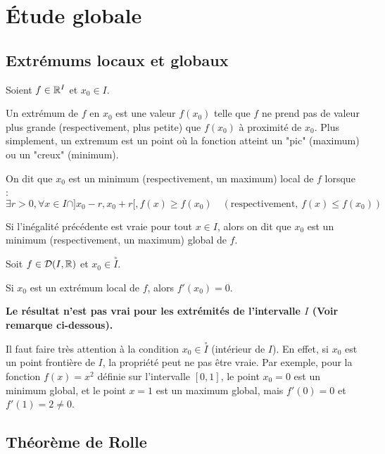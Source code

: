 \documentclass[12pt, a4paper]{report}
\begin{document}
\chapter{Étude globale}

\section{Extrémums locaux et globaux}

\begin{definition}
  Soient $f \in \mathbb{R}^I$ et $x_0 \in I$.

  Un extrémum de $f$ en $x_0$ est une valeur $f(x_0)$ telle que $f$ ne prend pas de valeur plus grande (respectivement, plus petite) que $f(x_0)$ à proximité de $x_0$. Plus simplement, un extremum est un point où la fonction atteint un "pic" (maximum) ou un "creux" (minimum).

  On dit que $x_0$ est un minimum (respectivement, un maximum) local de $f$ lorsque :
  \[\exists r > 0, \forall x \in I \cap ]x_0 - r, x_0 + r[, f(x) \geq f(x_0) \quad (\text{respectivement, } f(x) \leq f(x_0))\]

  Si l'inégalité précédente est vraie pour tout $x \in I$, alors on dit que $x_0$ est un minimum (respectivement, un maximum) global de $f$.
\end{definition}

\begin{property}
  Soit $f \in \mathcal{D}(I,\mathbb{R})$ et $x_0 \in \overset{\circ}{I}$.

  Si $x_0$ est un extrémum local de $f$, alors $f'(x_0) = 0$.

  \textbf{Le résultat n'est pas  vrai pour les extrémités de l'intervalle $I$ (Voir remarque ci-dessous).}
\end{property}

\begin{remark}
  Il faut faire très attention à la condition $x_0 \in \overset{\circ}{I}$ (intérieur de $I$). En effet, si $x_0$ est un point frontière de $I$, la propriété peut ne pas être vraie. Par exemple, pour la fonction $f(x) = x^2$ définie sur l'intervalle $[0, 1]$, le point $x_0 = 0$ est un minimum global, et le point $x=1$ est un maximum global, mais $f'(0) = 0$ et $f'(1) = 2 \neq 0$.
\end{remark}

\section{Théorème de Rolle}
\end{document}
